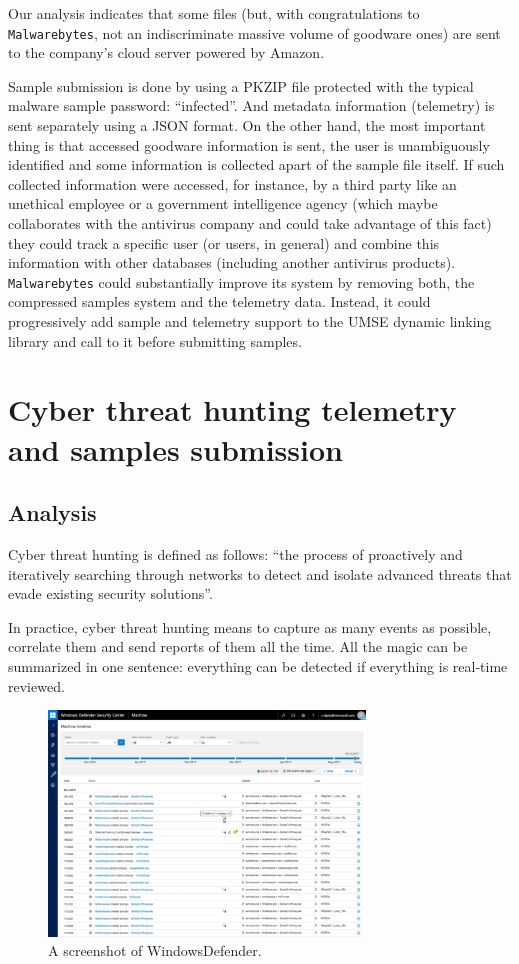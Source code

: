 Our analysis indicates that some files (but, with congratulations to
\texttt{Malwarebytes}, not an indiscriminate massive volume of goodware ones)
are sent to the company's cloud server powered by Amazon.

Sample submission is done by using a PKZIP file protected with the typical
malware sample password: ``infected''\cite{ZeltserShareMalware}. And metadata information (telemetry) is
sent separately using a JSON format.  On the other hand, the most important
thing is that accessed goodware information is sent, the user is unambiguously
identified and some information is collected apart of the sample file itself.
If such collected information were accessed, for instance, by a third party
like an unethical employee or a government intelligence agency (which maybe
collaborates with the antivirus company and could take advantage of this fact)
they could track a specific user (or users, in general) and combine this
information with other databases (including another antivirus products)\cite{KasperskyBoundariesOfTrust}.
\texttt{Malwarebytes} could substantially improve its system by removing both,
the compressed samples system and the telemetry data. Instead, it could
progressively add sample and telemetry support to the UMSE dynamic linking
library and call to it before submitting samples.

\section{Cyber threat hunting telemetry and samples submission}

\subsection{Analysis}

Cyber threat hunting is defined as follows: ``the process of proactively and
iteratively searching through networks to detect and isolate advanced threats
that evade existing security solutions''.

In practice, cyber threat hunting means to capture as many events as possible,
correlate them and send reports of them all the time. All the magic can be
summarized in one sentence: everything can be detected if everything is
real-time reviewed.
\begin{figure}
  \centering
  \includegraphics[width=0.75\textwidth]{./figures/WindowsDefender}
  \caption{\label{fig:WindowsDefender} A screenshot of WindowsDefender.}
\end{figure}

